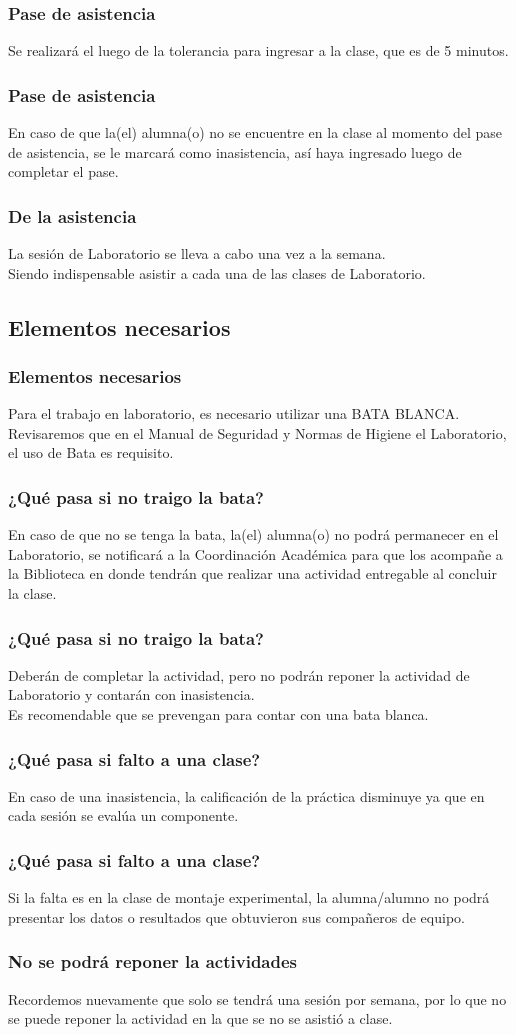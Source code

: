 \documentclass[14pt]{beamer}
\begin{document}
\begin{frame}
\frametitle{Pase de asistencia}
Se realizará el  luego de la tolerancia para ingresar a la clase, que es de 5 minutos.
\end{frame}
\begin{frame}
\frametitle{Pase de asistencia}
En caso de que la(el) alumna(o) no se encuentre en la clase al momento del pase de asistencia, se le marcará como inasistencia, así haya ingresado luego de completar el pase.
\end{frame}
\begin{frame}
\frametitle{De la asistencia}
La sesión de Laboratorio se lleva a cabo una vez a la semana.
\\
\bigskip
\pause
Siendo indispensable asistir a cada una de las clases de Laboratorio.
\end{frame}
    
\subsection{Elementos necesarios}

\begin{frame}
\frametitle{Elementos necesarios}
Para el trabajo en laboratorio, es necesario utilizar una BATA BLANCA.
\\
\bigskip
\pause
Revisaremos que en el Manual de Seguridad y Normas de Higiene el Laboratorio, el uso de Bata es requisito.
\end{frame}
\begin{frame}
\frametitle{¿Qué pasa si no traigo la bata?}
En caso de que no se tenga la bata, la(el) alumna(o) no podrá permanecer en el Laboratorio, \pause se notificará a la Coordinación Académica para que los acompañe a la Biblioteca en donde tendrán que realizar una actividad entregable al concluir la clase.
\end{frame}
\begin{frame}
\frametitle{¿Qué pasa si no traigo la bata?}
Deberán de completar la actividad, pero no podrán reponer la actividad de Laboratorio y contarán con inasistencia.
\\
\bigskip
\pause
Es recomendable que se prevengan para contar con una bata blanca.
\end{frame}
\begin{frame}
\frametitle{¿Qué pasa si falto a una clase?}
En caso de una inasistencia, la calificación de la práctica disminuye ya que en cada sesión se evalúa un componente.
\end{frame}
\begin{frame}
\frametitle{¿Qué pasa si falto a una clase?}
Si la falta es en la clase de montaje experimental, la alumna/alumno no podrá presentar los datos o resultados que obtuvieron sus compañeros de equipo.
\end{frame}
\begin{frame}
\frametitle{No se podrá reponer la actividades}
Recordemos nuevamente que solo se tendrá una sesión por semana, por lo que no se puede reponer la actividad en la que se no se asistió a clase.
\end{frame}
\end{document}
